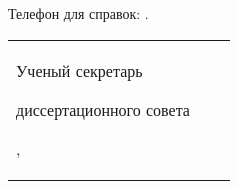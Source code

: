 \vspace{0.008\paperheight plus1fill}

\noindent Телефон для справок: .

\vspace{0.008\paperheight plus1fill}
\noindent%
\begin{tabularx}{\textwidth}{@{}%
>{\raggedright\arraybackslash}b{18em}@{}
>{\centering\arraybackslash}X
r
@{}}
    Ученый секретарь\par
    диссертационного совета\par
    ,\par
    &
\end{tabularx}
